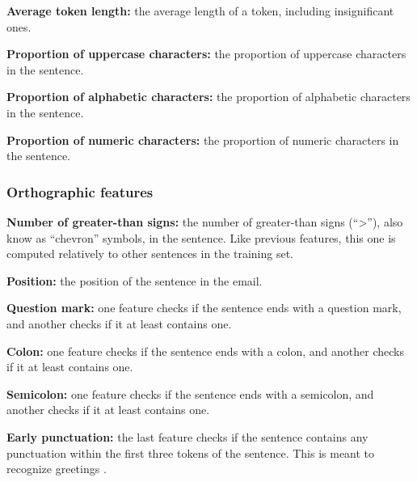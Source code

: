 \textbf{Average token length:} the average length of a token, including insignificant ones.

\textbf{Proportion of uppercase characters:} the proportion of uppercase characters in the sentence.

\textbf{Proportion of alphabetic characters:} the proportion of alphabetic characters in the sentence.

\textbf{Proportion of numeric characters:} the proportion of numeric characters in the sentence.

\subsubsection{Orthographic features}

\textbf{Number of greater-than signs:} the number of greater-than signs (``>''), also know as ``chevron'' symbols, in the sentence. Like previous features, this one is computed relatively to other sentences in the training set.

\textbf{Position:} the position of the sentence in the email.

\textbf{Question mark:} one feature checks if the sentence ends with a question mark, and another checks if it at least contains one.

\textbf{Colon:} one feature checks if the sentence ends with a colon, and another checks if it at least contains one.

\textbf{Semicolon:} one feature checks if the sentence ends with a semicolon, and another checks if it at least contains one.

\textbf{Early punctuation:} the last feature checks if the sentence contains any punctuation within the first three tokens of the sentence. This is meant to recognize greetings \cite{qadir2011classifying}.

